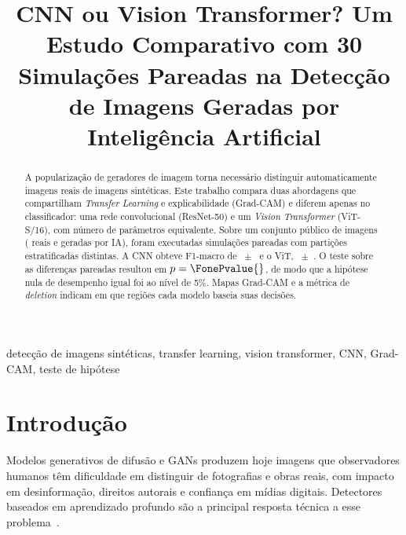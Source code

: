 \documentclass[conference]{IEEEtran}
\begin{document}
\title{CNN ou Vision Transformer? Um Estudo Comparativo com 30 Simulações Pareadas
na Detecção de Imagens Geradas por Inteligência Artificial}

\author{
}

\maketitle

\begin{abstract}
A popularização de geradores de imagem torna necessário distinguir automaticamente
imagens reais de imagens sintéticas. Este trabalho compara duas abordagens que
compartilham \emph{Transfer Learning} e explicabilidade (Grad-CAM) e diferem apenas
no classificador: uma rede convolucional (ResNet-50) e um \emph{Vision Transformer}
(ViT-S/16), com número de parâmetros equivalente. Sobre um conjunto público de
\NImages{} imagens (\NReal{} reais e \NAi{} geradas por IA), foram executadas
\NSim{} simulações pareadas com partições estratificadas distintas. A CNN obteve
F1-macro de \FoneCnnMean{}~$\pm$~\FoneCnnStd{} e o ViT, \FoneVitMean{}~$\pm$~\FoneVitStd{}.
O teste \FoneTest{} sobre as diferenças pareadas resultou em $p=\FonePvalue{}$, de modo
que a hipótese nula de desempenho igual foi \Rejected{} ao nível de 5\%.
Mapas Grad-CAM e a métrica de \emph{deletion} indicam em que regiões cada modelo
baseia suas decisões.
\end{abstract}

\begin{IEEEkeywords}
detecção de imagens sintéticas, transfer learning, vision transformer, CNN,
Grad-CAM, teste de hipótese
\end{IEEEkeywords}

\section{Introdução}
Modelos generativos de difusão e GANs produzem hoje imagens que observadores humanos
têm dificuldade em distinguir de fotografias e obras reais, com impacto em
desinformação, direitos autorais e confiança em mídias digitais. Detectores
baseados em aprendizado profundo são a principal resposta técnica a esse
problema~\cite{wang2020cnnspot,corvi2023diffusion,ojha2023universal}.
\end{document}
